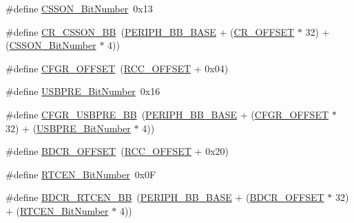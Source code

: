 \begin{DoxyCompactItemize}
\item 
\#define \mbox{\hyperlink{group___r_c_c___private___defines_ga253fa44d87aabc55f0cd6628e77a51fd}{C\+S\+S\+O\+N\+\_\+\+Bit\+Number}}~0x13
\item 
\#define \mbox{\hyperlink{group___r_c_c___private___defines_gaca914aed10477ae4090fea0a9639b1ea}{C\+R\+\_\+\+C\+S\+S\+O\+N\+\_\+\+BB}}~(\mbox{\hyperlink{group___peripheral__memory__map_gaed7efc100877000845c236ccdc9e144a}{P\+E\+R\+I\+P\+H\+\_\+\+B\+B\+\_\+\+B\+A\+SE}} + (\mbox{\hyperlink{group___r_c_c___private___defines_gafa1d3d0ea72132df651c76fc1bdffffc}{C\+R\+\_\+\+O\+F\+F\+S\+ET}} $\ast$ 32) + (\mbox{\hyperlink{group___r_c_c___private___defines_ga253fa44d87aabc55f0cd6628e77a51fd}{C\+S\+S\+O\+N\+\_\+\+Bit\+Number}} $\ast$ 4))
\item 
\#define \mbox{\hyperlink{group___r_c_c___private___defines_ga8682298330c3b9bae1992e4f1a0af985}{C\+F\+G\+R\+\_\+\+O\+F\+F\+S\+ET}}~(\mbox{\hyperlink{group___r_c_c___private___defines_ga539e07c3b3c55f1f1d47231341fb11e1}{R\+C\+C\+\_\+\+O\+F\+F\+S\+ET}} + 0x04)
\item 
\#define \mbox{\hyperlink{group___r_c_c___private___defines_gad758d602b6d2b93a04cb8ada87c20c82}{U\+S\+B\+P\+R\+E\+\_\+\+Bit\+Number}}~0x16
\item 
\#define \mbox{\hyperlink{group___r_c_c___private___defines_gabde4e60349b8412a79611c0aeb27c3a2}{C\+F\+G\+R\+\_\+\+U\+S\+B\+P\+R\+E\+\_\+\+BB}}~(\mbox{\hyperlink{group___peripheral__memory__map_gaed7efc100877000845c236ccdc9e144a}{P\+E\+R\+I\+P\+H\+\_\+\+B\+B\+\_\+\+B\+A\+SE}} + (\mbox{\hyperlink{group___r_c_c___private___defines_ga8682298330c3b9bae1992e4f1a0af985}{C\+F\+G\+R\+\_\+\+O\+F\+F\+S\+ET}} $\ast$ 32) + (\mbox{\hyperlink{group___r_c_c___private___defines_gad758d602b6d2b93a04cb8ada87c20c82}{U\+S\+B\+P\+R\+E\+\_\+\+Bit\+Number}} $\ast$ 4))
\item 
\#define \mbox{\hyperlink{group___r_c_c___private___defines_ga5f8a0c3cb5f5c835bf7eef09515138ad}{B\+D\+C\+R\+\_\+\+O\+F\+F\+S\+ET}}~(\mbox{\hyperlink{group___r_c_c___private___defines_ga539e07c3b3c55f1f1d47231341fb11e1}{R\+C\+C\+\_\+\+O\+F\+F\+S\+ET}} + 0x20)
\item 
\#define \mbox{\hyperlink{group___r_c_c___private___defines_ga9302c551752124766afc4cee65436405}{R\+T\+C\+E\+N\+\_\+\+Bit\+Number}}~0x0F
\item 
\#define \mbox{\hyperlink{group___r_c_c___private___defines_gaf70aaf70b0752ccb3a60307b2fb46038}{B\+D\+C\+R\+\_\+\+R\+T\+C\+E\+N\+\_\+\+BB}}~(\mbox{\hyperlink{group___peripheral__memory__map_gaed7efc100877000845c236ccdc9e144a}{P\+E\+R\+I\+P\+H\+\_\+\+B\+B\+\_\+\+B\+A\+SE}} + (\mbox{\hyperlink{group___r_c_c___private___defines_ga5f8a0c3cb5f5c835bf7eef09515138ad}{B\+D\+C\+R\+\_\+\+O\+F\+F\+S\+ET}} $\ast$ 32) + (\mbox{\hyperlink{group___r_c_c___private___defines_ga9302c551752124766afc4cee65436405}{R\+T\+C\+E\+N\+\_\+\+Bit\+Number}} $\ast$ 4))

\end{DoxyCompactItemize}
